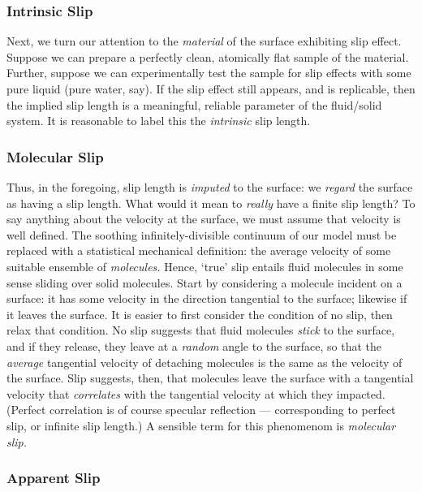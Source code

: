 \documentclass[12pt, a4paper, twoside, openright]{book}
\begin{document}
\subsubsection*{Intrinsic Slip}

Next, we turn our attention to the \emph{material} of the surface exhibiting  slip effect. Suppose we can prepare a perfectly clean, atomically flat sample of the material. Further, suppose we can experimentally test the sample for slip effects with some pure liquid (pure water, say). If the slip effect still appears, and is replicable, then the implied slip length is a meaningful, reliable parameter of the fluid/solid system. It is reasonable to label this the \emph{intrinsic} slip length.

\subsubsection*{Molecular Slip}

Thus, in the foregoing, slip length is \emph{imputed} to the surface: we \emph{regard} the surface as having a slip length. What would it mean to \emph{really} have a finite slip length? To say anything about the velocity at the surface, we must assume that velocity is well defined. The soothing infinitely-divisible continuum of our model must be replaced with a statistical mechanical definition: the average velocity of some suitable ensemble of \emph{molecules.} Hence, `true' slip entails fluid molecules in some sense sliding over solid molecules. Start by considering a molecule incident on a surface: it has some velocity in the direction tangential to the surface; likewise if it leaves the surface. It is easier to first consider the condition of no slip, then relax that condition. No slip suggests that fluid molecules \emph{stick} to the surface, and if they release, they leave at a \emph{random} angle to the surface, so that the \emph{average} tangential velocity of detaching molecules is the same as the velocity of the surface. Slip suggests, then, that molecules leave the surface with a tangential velocity that \emph{correlates} with the tangential velocity at which they impacted. (Perfect correlation is of course specular reflection --- corresponding to perfect slip, or infinite slip length.) A sensible term for this phenomenom is \emph{molecular slip.}

\subsubsection*{Apparent Slip}
\end{document}
